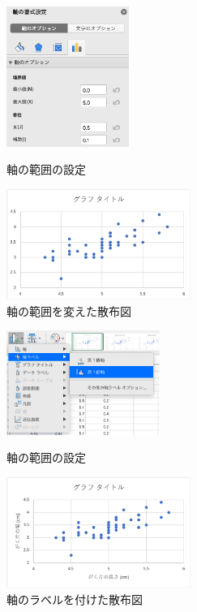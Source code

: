 \begin{figure}[tb]
    \begin{minipage}{0.5\hsize}
        \centering
        \includegraphics[width=4cm]{chap2/scatter_range.png}
        \caption{軸の範囲の設定}
        \label{fig:scatter_range}
    \end{minipage}
    \begin{minipage}{0.5\hsize}
        \centering
        \includegraphics[width=6cm]{chap2/scatter2.png}
        \caption{軸の範囲を変えた散布図}
        \label{fig:scatter2}
    \end{minipage}
\end{figure}

\begin{figure}[tb]
    \begin{minipage}{0.5\hsize}
        \centering
        \includegraphics[width=5cm]{chap2/scatter_label.png}
        \caption{軸の範囲の設定}
        \label{fig:scatter_label}
    \end{minipage}
    \begin{minipage}{0.5\hsize}
        \centering
        \includegraphics[width=6cm]{chap2/scatter3.png}
        \caption{軸のラベルを付けた散布図}
        \label{fig:scatter3}
    \end{minipage}
\end{figure}


